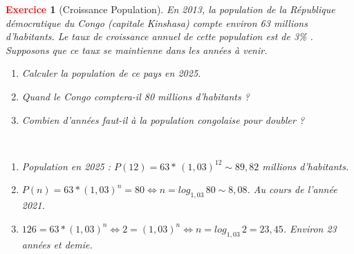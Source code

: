 \documentclass[11pt]{article}
\theoremstyle{mythmstyle}
\newtheorem{exo}{\textcolor{red}{\textbf{Exercice}}}
\begin{document}
\begin{exo}[Croissance Population]
En 2013, la population de la République démocratique du Congo (capitale Kinshasa) compte environ 63 millions d’habitants. Le taux de croissance annuel de cette population est de 3\% .
Supposons que ce taux se maintienne dans les années à venir.
\begin{enumerate}
    \item Calculer la population de ce pays en 2025.
    \item Quand le Congo comptera-il 80 millions d’habitants ?
   \item  Combien d’années faut-il à la population congolaise pour doubler ? 
\end{enumerate}
\begin{solution}[\ref{exp0-croissance}]
 \label{exp0-croissance-sol}
 \hfill\\
 \begin{enumerate}
     \item Population en 2025 : $P(12) = 63 \ast\, (1,03)^{12} \sim 89,82$ millions d’habitants.
     \item $P(n) = 63\ast (1,03)^n = 80 \Leftrightarrow n = log_{1,03}\, 80 \sim 8,08 $. Au cours de l’année 2021.
     \item $126=63\ast ( 1,03)^n \Leftrightarrow 2=(1,03)^n \Leftrightarrow n= log_{1,03}\, 2 =23,45$. Environ 23 années et demie.
 \end{enumerate}
\end{solution}
\end{exo}

\medskip




\medskip
\end{document}
